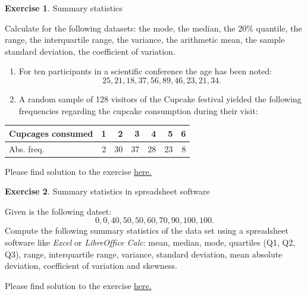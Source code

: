 \documentclass[
  12pt,
  oneside]{book}
\providecommand{\tightlist}{%
  \setlength{\itemsep}{0pt}\setlength{\parskip}{0pt}}
\theoremstyle{definition}
\theoremstyle{definition}
\theoremstyle{definition}
\newtheorem{exercise}{Exercise}[chapter]
\theoremstyle{definition}
\theoremstyle{remark}
\begin{document}
\begin{exercise}
\protect\hypertarget{exr:summarystatistics}{}\label{exr:summarystatistics}Summary statistics

Calculate for the following datasets: the mode, the median, the 20\% quantile, the range, the interquartile range, the variance, the arithmetic mean, the sample standard deviation, the coefficient of variation.

\begin{enumerate}
\def\labelenumi{\alph{enumi})}
\tightlist
\item
  For ten participants in a scientific conference the age
  has been noted: \[25, 21, 18, 37, 56, 89, 46, 23, 21, 34.\]
\item
  A random sample of 128 visitors of the Cupcake festival yielded the following frequencies regarding the cupcake consumption during their visit:
\end{enumerate}

\begin{longtable}[]{@{}lrrrrrr@{}}
\toprule()
Cupcages consumed & 1 & 2 & 3 & 4 & 5 & 6 \\
\midrule()
\endhead
Abs. freq. & 2 & 30 & 37 & 28 & 23 & 8 \\
\bottomrule()
\end{longtable}

Please find solution to the exercise \protect\hyperlink{sol:summarystatistics}{here.}
\end{exercise}

\begin{exercise}
\protect\hypertarget{exr:destatexcel}{}\label{exr:destatexcel}Summary statistics in spreadsheet software

Given is the following datset: \[0, 0, 40, 50, 50, 60, 70, 90, 100, 100.\]
Compute the following summary statistics of the data set using a spreadsheet software like \textit{Excel} or \textit{LibreOffice Calc}:
mean, median, mode, quartiles (Q1, Q2, Q3), range, interquartile range, variance, standard deviation, mean absolute deviation, coefficient of variation and skewness.

Please find solution to the exercise \protect\hyperlink{sol:destatexcel}{here.}
\end{exercise}
\end{document}
